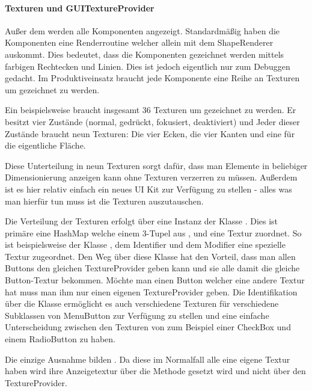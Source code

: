 \paragraph{Texturen und GUITextureProvider}

Außer dem  werden alle Komponenten angezeigt. Standardmäßig haben die Komponenten eine Renderroutine welcher allein mit dem ShapeRenderer auskommt. Dies bedeutet, dass die Komponenten gezeichnet werden mittels farbigen Rechtecken und Linien. Dies ist jedoch eigentlich nur zum Debuggen gedacht. Im Produktiveinsatz braucht jede Komponente eine Reihe an Texturen um gezeichnet zu werden.

Ein  beispielsweise braucht insgesamt 36 Texturen um gezeichnet zu werden. Er besitzt vier Zustände (normal, gedrückt, fokusiert, deaktiviert) und Jeder dieser Zustände braucht neun Texturen: Die vier Ecken, die vier Kanten und eine für die eigentliche Fläche.


Diese Unterteilung in neun Texturen sorgt dafür, dass man Elemente in beliebiger Dimensionierung anzeigen kann ohne Texturen verzerren zu müssen. Außerdem ist es hier relativ einfach ein neues UI Kit zur Verfügung zu stellen - alles was man hierfür tun muss ist die Texturen auszutauschen.

Die Verteilung der Texturen erfolgt über eine Instanz der Klasse . Dies ist primäre eine HashMap welche einem 3-Tupel aus ,  und  eine Textur zuordnet. So ist beispielsweise der Klasse , dem Identifier  und dem Modifier  eine spezielle Textur zugeordnet.
Den Weg über diese Klasse hat den Vorteil, dass man allen Buttons den gleichen TextureProvider geben kann und sie alle damit die gleiche Button-Textur bekommen. Möchte man einen Button welcher eine andere Textur hat muss man ihm nur einen eigenen TextureProvider geben. Die Identifikation über die Klasse ermöglicht es auch verschiedene Texturen für verschiedene Subklassen von MenuButton zur Verfügung zu stellen und eine einfache Unterscheidung zwischen den Texturen von zum Beispiel einer CheckBox und einem RadioButton zu haben.

Die einzige Ausnahme bilden . Da diese im Normalfall alle eine eigene Textur haben wird ihre Anzeigetextur über die Methode  gesetzt wird und nicht über den TextureProvider.

